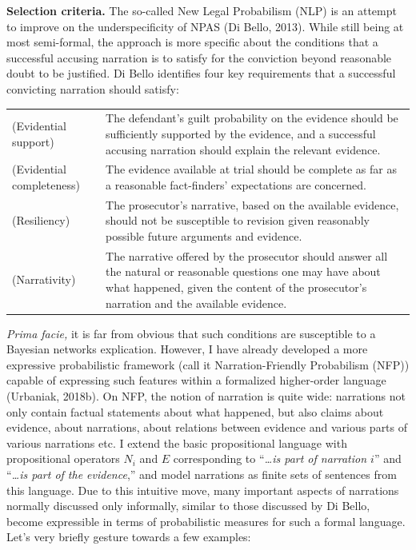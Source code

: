 \documentclass[11pt,dvipsnames,enabledeprecatedfontcommands]{scrartcl}
\begin{document}
\noindent
 \textbf{Selection criteria.} The so-called New Legal Probabilism (NLP)
is an attempt to improve on the underspecificity of NPAS (Di Bello,
2013). While still being at most semi-formal, the approach is more
specific about the conditions that a successful accusing narration is to
satisfy for the conviction beyond reasonable doubt to be justified. Di
Bello identifies four key requirements that a successful convicting
narration should satisfy:

\vspace{2mm}

\begin{center}
\begin{tabular}{@{}lp{11.5cm}@{}}
\toprule
 (Evidential support) &The defendant's guilt probability on the evidence should be sufficiently supported by the evidence, and a successful accusing narration should explain the relevant evidence. \\
(Evidential completeness) &  The evidence available at trial should be complete as far as a reasonable fact-finders' expectations are concerned. \\
(Resiliency)&  The prosecutor's narrative, based on the available evidence, should not be susceptible to revision given reasonably possible future arguments and evidence. \\
(Narrativity) & The narrative offered by the prosecutor should answer all 
the natural or reasonable questions one may have about what happened, given the content of the prosecutor's narration and the available evidence. \\
\bottomrule
\end{tabular}
\end{center}

\vspace{2mm}

\emph{Prima facie,} it is far from obvious that such conditions are
susceptible to a Bayesian networks explication. However, I have already
developed a more expressive probabilistic framework (call it
Narration-Friendly Probabilism (NFP)) capable of expressing such
features within a formalized higher-order language (Urbaniak, 2018b). On
NFP, the notion of narration is quite wide: narrations not only contain
factual statements about what happened, but also claims about evidence,
about narrations, about relations between evidence and various parts of
various narrations etc. I extend the basic propositional language with
propositional operators \(N_i\) and \(E\) corresponding to
``\emph{\dots is part of narration $i$}'' and
``\emph{\dots is part of the evidence},'' and model narrations as finite
sets of sentences from this language. Due to this intuitive move, many
important aspects of narrations normally discussed only informally,
similar to those discussed by Di Bello, become expressible in terms of
probabilistic measures for such a formal language. Let's very briefly
gesture towards a few examples:
\end{document}
